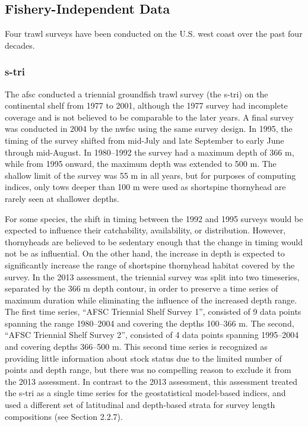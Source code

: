 \documentclass[11pt,
  letterpaper,
]{article}
\begin{document}
\hypertarget{fishery-independent-data}{%
\subsection{Fishery-Independent Data}\label{fishery-independent-data}}

Four trawl surveys have been conducted on the U.S. west coast over the past four decades.

\hypertarget{section}{%
\subsubsection{\texorpdfstring{\acrlong{s-tri}}{}}\label{section}}

The \gls{afsc} conducted a triennial groundfish trawl survey (the \Gls{s-tri}) on the continental shelf from 1977 to 2001, although the 1977 survey had incomplete coverage and is not believed to be comparable to the later years. A final survey was conducted in 2004 by the \gls{nwfsc} using the same survey design. In 1995, the timing of the survey shifted from mid-July and late September to early June through mid-August. In 1980--1992 the survey had a maximum depth of 366 m, while from 1995 onward, the maximum depth was extended to 500 m. The shallow limit of the survey was 55 m in all years, but for purposes of computing indices, only tows deeper than 100 m were used as shortspine thornyhead are rarely seen at shallower depths.

For some species, the shift in timing between the 1992 and 1995 surveys would be expected to influence their catchability, availability, or distribution. However, thornyheads are believed to be sedentary enough that the change in timing would not be as influential. On the other hand, the increase in depth is expected to significantly increase the range of shortspine thornyhead habitat covered by the survey. In the 2013 assessment, the triennial survey was split into two timeseries, separated by the 366 m depth contour, in order to preserve a time series of maximum duration while eliminating the influence of the increased depth range. The first time series, ``AFSC Triennial Shelf Survey 1'', consisted of 9 data points spanning the range 1980--2004 and covering the depths 100--366 m. The second, ``AFSC Triennial Shelf Survey 2'', consisted of 4 data points spanning 1995--2004 and covering depths 366--500 m. This second time series is recognized as providing little information about stock status due to the limited number of points and depth range, but there was no compelling reason to exclude it from the 2013 assessment. In contrast to the 2013 assessment, this assessment treated the \gls{s-tri} as a single time series for the geostatistical model-based indices, and used a different set of latitudinal and depth-based strata for survey length compositions (see Section 2.2.7).
\end{document}
